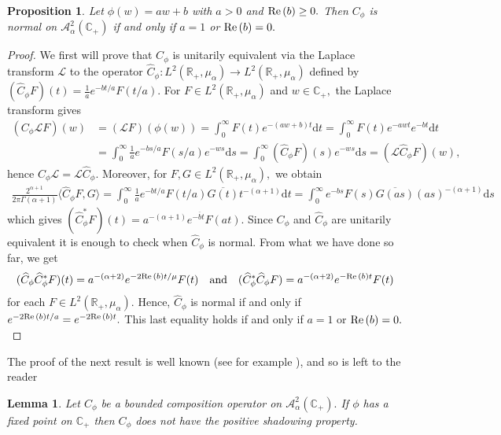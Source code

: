 \documentclass[11pt]{amsart}%
\numberwithin{equation}{section}
\theoremstyle{plain}
\newtheorem{lem}[thm]{Lemma}
\newtheorem{prop}[thm]{Proposition}
\theoremstyle{definition}
\theoremstyle{definition}
\newcommand{\re}{{\rm Re}\,}
\newcommand{\hb}{\mathbb{C}_+}
\newcommand{\Ber}{\mathcal{A}^2_{\alpha}(\hb)}
\newcommand{\D}{\mathrm{d}}
\begin{document}
\begin{prop}\label{normal} Let $\phi(w)=a w+b$ with $a>0$ and $\re(b)\geq 0.$ Then $C_{\phi}$ is normal on $\Ber$ if and only if $a=1$ or $\re(b)=0.$
\end{prop}
\begin{proof}We first will prove that $C_{\phi}$ is unitarily equivalent via the Laplace transform $\mathcal{L}$ to the operator $\widehat{C}_{\phi}:L^2(\mathbb{R}_+, \mu_{\alpha})\rightarrow L^2(\mathbb{R}_+, \mu_{\alpha})$ defined by $(\widehat{C}_{\phi}F)(t)=\frac{1}{a}e^{-bt/a}F(t/a).$ For $F\in L^2(\mathbb{R}_+, \mu_{\alpha})$ and $w\in \hb,$ the Laplace transform gives 
\begin{align*}
(C_{\phi}\mathcal{L}F)(w)&=(\mathcal{L}F)(\phi(w))=\int^{\infty}_0F(t)e^{-(a w+b)t}\D t=\int^{\infty}_0F(t)e^{-a wt }e^{-bt}\D t\\
&=\int_0^{\infty}\frac{1}{a}e^{-bs/a}F\left(s/a\right)e^{-ws}\D s=\int^{\infty}_0(\widehat{C}_{\phi}F)(s)e^{-ws}\D s=(\mathcal{L}\widehat{C}_{\phi}F)(w),
\end{align*}
hence $C_{\phi}\mathcal{L}=\mathcal{L}\widehat{C}_{\phi}.$  Moreover, for $F,G\in L^2(\mathbb{R}_+, \mu_{\alpha}),$ we obtain
\begin{align*}
\frac{2^{\alpha+1}}{2\pi\Gamma(\alpha+1)}\langle \widehat{C}_{\phi}F,G\rangle=
\int^{\infty}_0\frac{1}{a}e^{-bt/a}F(t/a)\overline{G(t)}t^{-(\alpha+1)}\D t
=\int^{\infty}_0e^{-bs}F(s)\overline{G(a s)}(a s)^{-(\alpha+1)}\D s
\end{align*}
which gives  $(\widehat{C}_{\phi}^*F)(t)=a^{-(\alpha+1)}e^{-\overline{b}t}F(a t).$
Since $C_{\phi}$ and $\widehat{C}_{\phi}$ are unitarily equivalent it is enough to check when $\widehat{C}_{\phi}$ is normal. From what we have done so far, we get
\begin{align}\label{normal equation}
(\widehat{C}_{\phi}\widehat{C}_{\phi}^*F)(t)=a^{-(\alpha+2)}e^{-2\re(b)t/\mu}F(t) \quad \text{and}  \quad (\widehat{C}_{\phi}^*\widehat{C}_{\phi}F)=a^{-(\alpha+2)}e^{-\re(b)t}F(t)
\end{align}
for each $F\in L^2(\mathbb{R}_+, \mu_{\alpha}).$ Hence, $\widehat{C}_{\phi}$ is normal if and only if $e^{-2\re(b)t/a}=e^{-2\re(b)t}.$ This last equality holds if and only if $a=1$ or $\re(b)=0.$
\end{proof}

The proof of the next result is well known (see for example \cite[Prop. 1]{Carlos}), and so is left to the reader

\begin{lem}\label{lemma shadowing} Let $C_{\phi}$ be a bounded composition operator on $\Ber.$ If $\phi$ has a fixed point on $\hb$ then $C_{\phi}$ does not have the positive shadowing property.
\end{lem}
\end{document}

